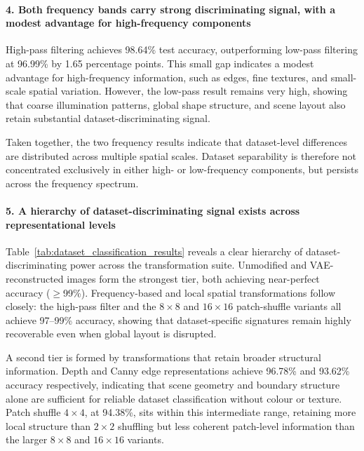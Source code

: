 \paragraph{4. Both frequency bands carry strong discriminating signal, with a modest advantage for high-frequency components}

High-pass filtering achieves 98.64\% test accuracy, outperforming low-pass filtering at 96.99\% by 1.65 percentage points. This small gap indicates a modest advantage for high-frequency information, such as edges, fine textures, and small-scale spatial variation. However, the low-pass result remains very high, showing that coarse illumination patterns, global shape structure, and scene layout also retain substantial dataset-discriminating signal.

Taken together, the two frequency results indicate that dataset-level differences are distributed across multiple spatial scales. Dataset separability is therefore not concentrated exclusively in either high- or low-frequency components, but persists across the frequency spectrum.

\paragraph{5. A hierarchy of dataset-discriminating signal exists across representational levels}

Table~\ref{tab:dataset_classification_results} reveals a clear hierarchy of dataset-discriminating power across the transformation suite. Unmodified and VAE-reconstructed images form the strongest tier, both achieving near-perfect accuracy ($\geq$99\%). Frequency-based and local spatial transformations follow closely: the high-pass filter and the $8{\times}8$ and $16{\times}16$ patch-shuffle variants all achieve 97--99\% accuracy, showing that dataset-specific signatures remain highly recoverable even when global layout is disrupted.

A second tier is formed by transformations that retain broader structural information. Depth and Canny edge representations achieve 96.78\% and 93.62\% accuracy respectively, indicating that scene geometry and boundary structure alone are sufficient for reliable dataset classification without colour or texture. Patch shuffle $4{\times}4$, at 94.38\%, sits within this intermediate range, retaining more local structure than $2{\times}2$ shuffling but less coherent patch-level information than the larger $8{\times}8$ and $16{\times}16$ variants.

